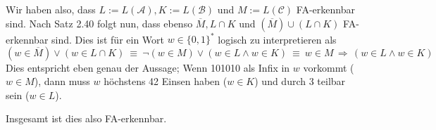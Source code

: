 \documentclass[a4paper,graphics,11pt]{article}
\begin{document}
Wir haben also, dass $L := L(\mathcal{A}), K := L(\mathcal{B})$ und $M := L(\mathcal{C})$ FA-erkennbar sind.
Nach Satz 2.40 folgt nun, dass ebenso $\overline{M}, L \cap K$ und $(\overline{M}) \cup (L \cap K)$ FA-erkennbar
sind.
Dies ist für ein Wort $w \in \{0, 1\}^*$ logisch zu interpretieren als
$$
    (w \in \overline{M}) \lor (w \in L \cap K)\
    \equiv\ \lnot (w \in M) \lor (w \in L \land w \in K)\
    \equiv\ w \in M \,\Longrightarrow\, (w \in L \land w \in K)
$$
Dies entspricht eben genau der Aussage; Wenn 101010 als Infix in $w$ vorkommt ($w \in M$), dann muss 
$w$ höchstens 42 Einsen haben ($w \in K$) und durch 3 teilbar sein ($w \in L$).

Insgesamt ist dies also FA-erkennbar.
\end{document}
